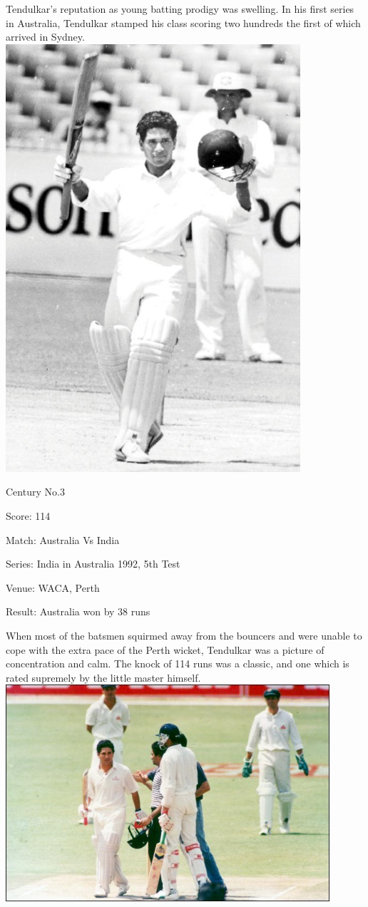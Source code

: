 \documentclass[11pt, a4paper]{article}
\begin{document}
Tendulkar's reputation as young batting prodigy was swelling. In his first series in Australia, Tendulkar stamped his class scoring two hundreds the first of which arrived in Sydney.
\newpage
\includegraphics[height=0.8\textheight]{pics/3.jpg}

Century No.3 

Score: 114 

Match: Australia Vs India 

Series: India in Australia 1992, 5th Test 

Venue: WACA, Perth 

Result: Australia won by 38 runs 

When most of the batsmen squirmed away from the bouncers and were unable to cope with the extra pace of the Perth wicket, Tendulkar was a picture of concentration and calm. The knock of 114 runs was a classic, and one which is rated supremely by the little master himself.
\newpage
\includegraphics[width=0.9\textwidth]{pics/4.jpg}
\end{document}
